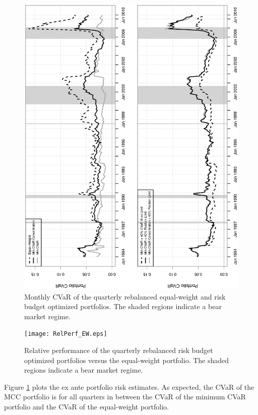 \documentclass[12pt,a4paper]{article}
\begin{document}
\begin{figure}[tb]
\begin{center}
\caption{Monthly CVaR of the quarterly rebalanced equal-weight and risk budget optimized portfolios. The shaded regions indicate a bear market regime.\label{fig:CVaR_dynamic}   }
\includegraphics[width=12cm,height=15cm,angle=270]{portfolioCVaR_CC.eps}
\end{center}
\end{figure}

\begin{figure}[tb]
\begin{center}
\caption{Relative performance of the quarterly rebalanced risk budget optimized portfolios versus the equal-weight portfolio. The shaded regions indicate a bear market regime.  \label{fig:relperformance}}
\texttt{[image: RelPerf\_EW.eps]}
\end{center}
\end{figure}

Figure \ref{fig:CVaR_dynamic} plots the ex ante portfolio risk estimates. As expected, the CVaR of the MCC portfolio is for all quarters in between the CVaR of the minimum CVaR portfolio and the CVaR of the equal-weight portfolio.
\end{document}
